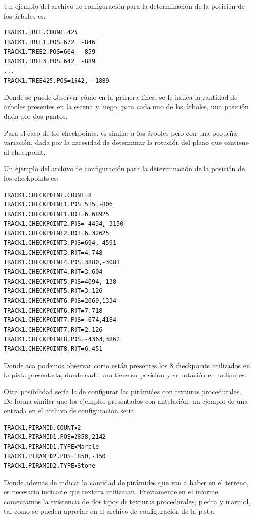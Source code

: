 \documentclass[a4paper,10pt]{article}
\begin{document}
Un ejemplo del archivo de configuraci\'on para la determinaci\'on de la
posici\'on
de
los \'arboles es:

\begin{verbatim}
TRACK1.TREE.COUNT=425
TRACK1.TREE1.POS=672, -846
TRACK1.TREE2.POS=664, -859
TRACK1.TREE3.POS=642, -889
...
TRACK1.TREE425.POS=1642, -1889
\end{verbatim}

Donde se puede observar c\'omo en la primera l\'inea, se le indica la cantidad
de
\'arboles presentes en la escena y luego, para cada uno de los \'arboles, una
posici\'on dada por dos puntos.

Para el caso de los checkpoints, es similar a los \'arboles pero con una
peque\~na
variaci\'on, dada por la necesidad de determinar la rotaci\'on del plano que
contiene al checkpoint.

Un ejemplo del archivo de configuraci\'on para la determinaci\'on de la
posici\'on
de
los checkpoints es:

\begin{verbatim}
TRACK1.CHECKPOINT.COUNT=8
TRACK1.CHECKPOINT1.POS=515,-806
TRACK1.CHECKPOINT1.ROT=6.68925
TRACK1.CHECKPOINT2.POS=-4434,-3150
TRACK1.CHECKPOINT2.ROT=6.32625
TRACK1.CHECKPOINT3.POS=694,-4591
TRACK1.CHECKPOINT3.ROT=4.748
TRACK1.CHECKPOINT4.POS=3880,-3081
TRACK1.CHECKPOINT4.ROT=3.604
TRACK1.CHECKPOINT5.POS=4094,-138
TRACK1.CHECKPOINT5.ROT=3.126
TRACK1.CHECKPOINT6.POS=2069,1334
TRACK1.CHECKPOINT6.ROT=7.718
TRACK1.CHECKPOINT7.POS=-674,4184
TRACK1.CHECKPOINT7.ROT=2.126
TRACK1.CHECKPOINT8.POS=-4363,3862
TRACK1.CHECKPOINT8.ROT=6.451
\end{verbatim}

Donde aca podemos observar como est\'an presentes los 8 checkpoints utilizados
en
la pista presentada, donde cada uno tiene su posici\'on y su rotaci\'on en
radiantes.

Otra posibilidad ser\'ia la de configurar las pir\'amides con texturas
procedurales.  De forma similar que los ejemplos presentados con antelaci\'on,
un
ejemplo de una entrada en el archivo de configuraci\'on ser\'ia:

\begin{verbatim}
TRACK1.PIRAMID.COUNT=2
TRACK1.PIRAMID1.POS=2858,2142
TRACK1.PIRAMID1.TYPE=Marble
TRACK1.PIRAMID2.POS=1850,-150
TRACK1.PIRAMID2.TYPE=Stone
\end{verbatim}

Donde adem\'as de indicar la cantidad de pir\'amides que van a haber en el
terreno,
es necesario indicarle que textura utilizaran.  Previamente en el informe
comentamos la existencia de dos tipos de texturas procedurales, piedra y
marmol, tal como se pueden apreciar en el archivo de configuraci\'on de la
pista.
\end{document}

